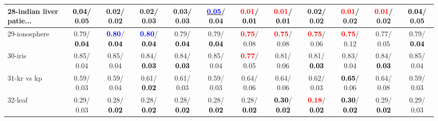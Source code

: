 \begin{table}[h]
\begin{center}
{\begin{tabular}{lc|c|c|c|c|c|c|c|c|c|c}
28-indian liver patie... & \textcolor{black}{\textbf{  0.04}}/  0.05 &   0.02/  0.02 &   0.02/  0.03 &   0.03/  0.03 & \underline{\textcolor{blue}{\textbf{  0.05}}}/  0.04 & \textcolor{red}{\textbf{  0.01}}/\textcolor{black}{\textbf{  0.01}} & \textcolor{red}{\textbf{  0.01}}/\textcolor{black}{\textbf{  0.01}} &   0.02/  0.02 & \textcolor{red}{\textbf{  0.01}}/  0.02 & \textcolor{red}{\textbf{  0.01}}/  0.02 & \textcolor{black}{\textbf{  0.04}}/  0.05 \\ \hline
29-ionosphere &   0.79/\textcolor{black}{\textbf{  0.04}} & \textcolor{blue}{\textbf{  0.80}}/\textcolor{black}{\textbf{  0.04}} & \textcolor{blue}{\textbf{  0.80}}/\textcolor{black}{\textbf{  0.04}} &   0.79/\textcolor{black}{\textbf{  0.04}} &   0.79/\textcolor{black}{\textbf{  0.04}} & \textcolor{red}{\textbf{  0.75}}/  0.08 & \textcolor{red}{\textbf{  0.75}}/  0.08 & \textcolor{red}{\textbf{  0.75}}/  0.06 & \textcolor{red}{\textbf{  0.75}}/  0.12 &   0.77/  0.05 &   0.79/\textcolor{black}{\textbf{  0.04}} \\
30-iris &   0.85/  0.04 &   0.85/  0.04 &   0.84/\textcolor{black}{\textbf{  0.03}} &   0.84/\textcolor{black}{\textbf{  0.03}} &   0.85/  0.04 & \textcolor{red}{\textbf{  0.77}}/  0.05 &   0.81/  0.06 &   0.81/\textcolor{black}{\textbf{  0.03}} &   0.83/  0.04 &   0.84/\textcolor{black}{\textbf{  0.03}} &   0.85/  0.04 \\
31-kr vs kp &   0.59/  0.03 &   0.59/  0.04 &   0.61/\textcolor{black}{\textbf{  0.02}} &   0.61/  0.03 &   0.59/  0.03 &   0.64/  0.06 &   0.64/  0.06 &   0.62/  0.03 & \textcolor{black}{\textbf{  0.65}}/  0.06 &   0.64/  0.08 &   0.59/  0.03 \\
32-leaf &   0.29/  0.03 &   0.28/\textcolor{black}{\textbf{  0.02}} &   0.28/\textcolor{black}{\textbf{  0.02}} &   0.28/\textcolor{black}{\textbf{  0.02}} &   0.28/\textcolor{black}{\textbf{  0.02}} &   0.28/\textcolor{black}{\textbf{  0.02}} & \textcolor{black}{\textbf{  0.30}}/\textcolor{black}{\textbf{  0.02}} & \textcolor{red}{\textbf{  0.18}}/\textcolor{black}{\textbf{  0.02}} & \textcolor{black}{\textbf{  0.30}}/\textcolor{black}{\textbf{  0.02}} &   0.29/\textcolor{black}{\textbf{  0.02}} &   0.29/  0.03 \\\end{tabular}}\label{stratsALCKappa0aSVMRedux}
\end{center}
\end{table}
